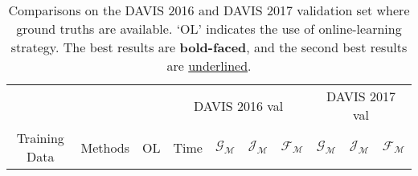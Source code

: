 \documentclass[runningheads]{llncs}
\begin{document}
\begin{table}
\caption{Comparisons on the DAVIS 2016 and DAVIS 2017 validation set where ground truths are available. `OL' indicates the use of online-learning strategy. The best results are \textbf{bold-faced}, and the second best results are \underline{underlined}.
}
\label{tab_davis16}
\centering
\begin{tabular}{clc|cccc|ccc}
\toprule
                               &                                        &            & \multicolumn{4}{c|}{DAVIS 2016 val}                                & \multicolumn{3}{c}{DAVIS 2017 val}                     \\
\multicolumn{1}{c}{Training Data} & \multicolumn{1}{c}{Methods}            & \; OL \;        & Time     & $\mathcal{G_M}$ & $\mathcal{J_M}$ & $\mathcal{F_M}$ & $\mathcal{G_M}$ & $\mathcal{J_M}$ & $\mathcal{F_M}$ \\
\midrule


\end{tabular}
\end{table}
\end{document}
